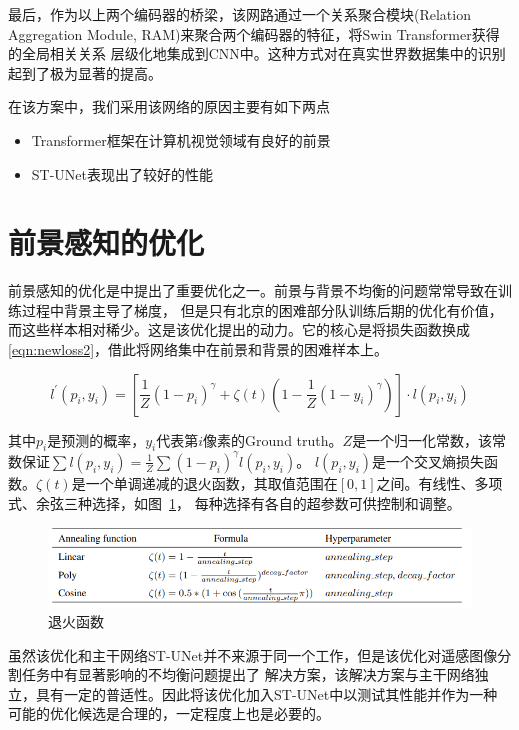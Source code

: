 \documentclass[a4paper,twoside,zihao=5,UTF8]{ctexrep}
\begin{document}
最后，作为以上两个编码器的桥梁，该网路通过一个关系聚合模块(Relation Aggregation Module, RAM)来聚合两个编码器的特征，将Swin Transformer获得的全局相关关系
层级化地集成到CNN中。这种方式对在真实世界数据集中的识别起到了极为显著的提高\cite{stunet}。

在该方案中，我们采用该网络的原因主要有如下两点

\begin{itemize}
    \item Transformer框架在计算机视觉领域有良好的前景
    \item ST-UNet表现出了较好的性能
\end{itemize}


\section{前景感知的优化}
前景感知的优化是\cite{farseg}中提出了重要优化之一。前景与背景不均衡的问题常常导致在训练过程中背景主导了梯度，
但是只有北京的困难部分队训练后期的优化有价值，而这些样本相对稀少。这是该优化提出的动力。它的核心是将损失函数换成
\eqref{eqn:newloss2}，借此将网络集中在前景和背景的困难样本上。

\begin{equation}
    \label{eqn:newloss2}
    l^{'}(p_i,y_i)=[\frac{1}{Z}(1-p_i)^\gamma+\zeta (t)(1-\frac{1}{Z}(1-y_i)^\gamma)]\cdot l(p_i,y_i)
\end{equation}

其中$p_i$是预测的概率，$y_i$代表第$i$像素的Ground truth。$Z$是一个归一化常数，该常数保证$\sum l(p_i,y_i)=\frac{1}{Z}\sum(1-p_i)^\gamma l(p_i,y_i)$。
$l(p_i,y_i)$是一个交叉熵损失函数。$\zeta(t)$是一个单调递减的退火函数，其取值范围在$[0,1]$之间。有线性、多项式、余弦三种选择，如图~\ref{fig:annel_func}，
每种选择有各自的超参数可供控制和调整。

\begin{figure}[htbp]
    \includegraphics[width=\textwidth]{annealing_funcs.png}
    \centering
    \caption{退火函数}
    \label{fig:annel_func}
\end{figure}

虽然该优化和主干网络ST-UNet并不来源于同一个工作，但是该优化对遥感图像分割任务中有显著影响的不均衡问题提出了
解决方案，该解决方案与主干网络独立，具有一定的普适性。因此将该优化加入ST-UNet中以测试其性能并作为一种
可能的优化候选是合理的，一定程度上也是必要的。
\end{document}
